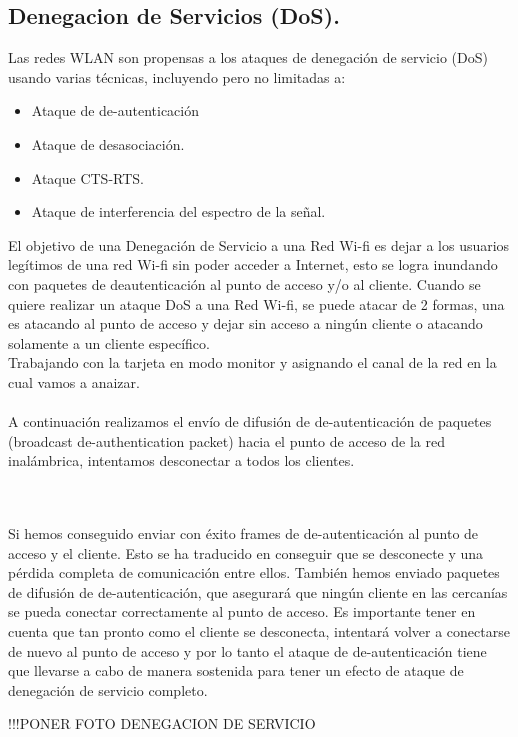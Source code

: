 \subsection {Denegacion de Servicios (DoS).} 
Las redes WLAN son propensas a los ataques de denegación de servicio (DoS) usando varias técnicas, incluyendo pero no limitadas a: 
 \begin{itemize}
   	\item Ataque de de-autenticación 
	\item Ataque de desasociación.
	\item Ataque CTS-RTS.
	\item Ataque de interferencia del espectro de la señal. 
 \end{itemize}

El objetivo de una Denegación de Servicio a una Red Wi-fi es dejar a los usuarios legítimos de una red Wi-fi sin poder acceder a Internet, esto se logra inundando con paquetes de deautenticación al punto de acceso y/o al cliente.
Cuando se quiere realizar un ataque DoS a una Red Wi-fi, se puede atacar de 2 formas, una es atacando al punto de acceso y dejar sin acceso a ningún cliente o atacando solamente a un cliente específico.\\

Trabajando con la tarjeta en modo monitor y asignando el canal de la red en la cual vamos a anaizar.\\

\textbf{}\\

A continuación realizamos el envío de difusión de de-autenticación de paquetes (broadcast de-authentication packet) hacia el punto de acceso de la red inalámbrica, intentamos desconectar a todos los clientes.

\textit{}\\

\textit{}\\

Si hemos conseguido enviar con éxito frames de de-autenticación al punto de acceso y el cliente. Esto se ha traducido en conseguir que se desconecte y una pérdida completa de comunicación entre ellos.
También hemos enviado paquetes de difusión de de-autenticación, que asegurará que ningún cliente en las cercanías se pueda conectar correctamente al punto de acceso.
Es importante tener en cuenta que tan pronto como el cliente se desconecta, intentará volver a conectarse de nuevo al punto de acceso y por lo tanto el ataque de de-autenticación tiene que llevarse a cabo de manera sostenida para tener un efecto de ataque de denegación de servicio completo. 

!!!PONER FOTO DENEGACION DE SERVICIO
